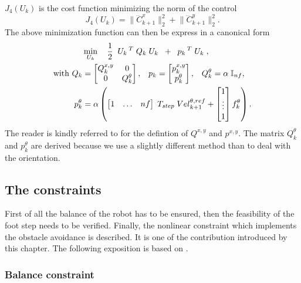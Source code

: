 $J_4(U_k)$ is the cost function minimizing the norm of the control
\begin{equation}
  J_4(U_k) = \lVert \dddot C_{k+1}^{x} \rVert^2_2
           + \lVert \dddot C_{k+1}^{y} \rVert^2_2
    \nonumber
    .
\end{equation}
The above minimization function can then be express in a canonical form
\begin{align}
  &\min_{U_k} \quad \frac{1}{2} \;\; U_{k}\,^T \;Q_k \;U_{k} \;\;+\;\; p_k\,^T \;U_{k} \;,\\
\text{with } Q_k &=
\begin{bmatrix}
Q^{x,y}_k & 0  \\
 0        & Q_k^{\theta}
\end{bmatrix}, \;\;\;
p_k =
\begin{bmatrix}
p_k^{x,y} \\
p_k^{\theta}
\end{bmatrix}, \;\;\;
Q_k^{\theta} = \alpha \;\mathbb{I}_{nf}, \notag\\
p_k^{\theta} &= \alpha \left(
    \begin{bmatrix}
    1&\hdots&nf
    \end{bmatrix} \;
    T_{step} \; {Vel}_{k+1}^{\theta,ref} +
    \begin{bmatrix}
    1\\\vdots\\1
    \end{bmatrix}f_{k}^\theta \right)
    .\notag
\end{align}
The reader is kindly referred to \cite{herdt:iros:2010} for the defintion of $Q^{x,y}$ and $p^{x,y}$.
The matrix $Q_k^{\theta}$ and $p_k^{\theta}$ are derived because we use a slightly different method than \cite{herdt:iros:2010} to deal with the orientation.

\subsection{The constraints}
\label{SubSec:constraints}
First of all the balance of the robot has to be ensured, then the feasibility of the foot step needs to be verified.
Finally, the nonlinear constraint which implements the obstacle avoidance is described. It is one of the contribution introduced by this chapter.
The following exposition is based on \cite{herdt:iros:2010}.

\subsubsection{Balance constraint}
\label{seq:Constraints}

